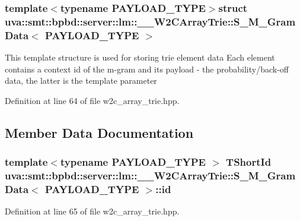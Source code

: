 \subsubsection*{template$<$typename P\+A\+Y\+L\+O\+A\+D\+\_\+\+T\+Y\+P\+E$>$struct uva\+::smt\+::bpbd\+::server\+::lm\+::\+\_\+\+\_\+\+W2\+C\+Array\+Trie\+::\+S\+\_\+\+M\+\_\+\+Gram\+Data$<$ P\+A\+Y\+L\+O\+A\+D\+\_\+\+T\+Y\+P\+E $>$}

This template structure is used for storing trie element data Each element contains a context id of the m-\/gram and its payload -\/ the probability/back-\/off data, the latter is the template parameter 

Definition at line 64 of file w2c\+\_\+array\+\_\+trie.\+hpp.



\subsection{Member Data Documentation}
\hypertarget{structuva_1_1smt_1_1bpbd_1_1server_1_1lm_1_1_____w2_c_array_trie_1_1_s___m___gram_data_a0b235c9677bb7fe150c1c0b9d400f2bc}{}
\subsubsection[{id}]{\setlength{\rightskip}{0pt plus 5cm}template$<$typename P\+A\+Y\+L\+O\+A\+D\+\_\+\+T\+Y\+P\+E $>$ {\bf T\+Short\+Id} {\bf uva\+::smt\+::bpbd\+::server\+::lm\+::\+\_\+\+\_\+\+W2\+C\+Array\+Trie\+::\+S\+\_\+\+M\+\_\+\+Gram\+Data}$<$ P\+A\+Y\+L\+O\+A\+D\+\_\+\+T\+Y\+P\+E $>$\+::id}\label{structuva_1_1smt_1_1bpbd_1_1server_1_1lm_1_1_____w2_c_array_trie_1_1_s___m___gram_data_a0b235c9677bb7fe150c1c0b9d400f2bc}


Definition at line 65 of file w2c\+\_\+array\+\_\+trie.\+hpp.

\hypertarget{structuva_1_1smt_1_1bpbd_1_1server_1_1lm_1_1_____w2_c_array_trie_1_1_s___m___gram_data_ac63b204aef5900bbd9caf0aed3c62e23}{}
